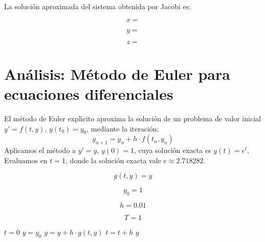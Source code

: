 \documentclass{article}
\begin{document}
La soluci\'on aproximada del sistema obtenida por Jacobi es:

\begin{equation}
    x =
    \label{eq:res:x}
\end{equation}

\begin{equation}
    y =
    \label{eq:res:y}
\end{equation}

\begin{equation}
    z =
    \label{eq:res:z}
\end{equation}


\section{An\'alisis: M\'etodo de Euler para ecuaciones diferenciales}

El m\'etodo de Euler expl\'{\i}cito aproxima la soluci\'on de un problema de valor inicial
$y' = f(t, y)$, $y(t_0) = y_0$, mediante la iteraci\'on:
\[
    y_{n+1} = y_n + h \cdot f(t_n, y_n)
\]
Aplicamos el m\'etodo a $y' = y$, $y(0) = 1$, cuya soluci\'on exacta es $y(t) = e^t$.
Evaluamos en $t = 1$, donde la soluci\'on exacta vale $e \approx 2.718282$.

\begin{equation}
    g(t, y) = y
    \label{eq:calc:g}
\end{equation}

\begin{equation}
    y_0 = 1
    \label{eq:calc:y0}
\end{equation}

\begin{equation}
    h = 0.01
    \label{eq:calc:h}
\end{equation}

\begin{equation}
    T = 1
    \label{eq:calc:T}
\end{equation}

\begin{algorithm}
\caption{M\'etodo de Euler para $y' = y$, $y(0) = 1$}
\label{alg:calc:y}
\begin{algorithmic}
    \STATE $t = 0$
    \STATE $y = y_0$
        \STATE $y = y + h \cdot g(t, y)$
        \STATE $t = t + h$
    \ENDWHILE
    \RETURN $y$
\end{algorithmic}
\end{algorithm}
\end{document}
